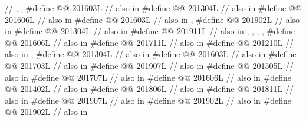 \begin{codeblock}
  // , , 
#define @@                            201603L // also in 
#define @@                    201304L // also in 
#define @@                          201606L // also in 
#define @@                201603L // also in , 
#define @@             201902L // also in 
#define @@                  201304L // also in 
#define @@                            201911L
  // also in , , , , 
#define @@             201606L // also in 
#define @@                      201711L // also in 
#define @@                  201210L // also in , 
#define @@       201304L // also in 
#define @@                            201603L // also in 
#define @@                       201703L // also in 
#define @@                         201907L // also in 
#define @@                      201505L // also in 
#define @@                 201707L // also in 
#define @@              201606L // also in 
#define @@                201402L // also in 
#define @@                             201806L // also in 
#define @@            201811L // also in 
#define @@                   201907L // also in 
#define @@                              201902L // also in 
#define @@                             201902L // also in 

\end{codeblock}
